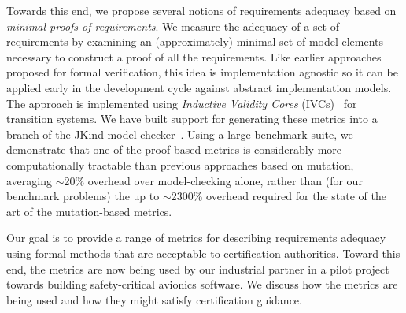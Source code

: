 \noindent Towards this end, we propose several notions of requirements adequacy based on {\em minimal proofs of requirements}.  We measure the adequacy of a set of requirements by examining an (approximately) minimal set of model elements necessary to construct a proof of all the requirements.  Like earlier approaches proposed for formal verification, this idea is implementation agnostic so it can be applied early in the development cycle against abstract implementation models.  The approach is implemented using {\em Inductive Validity Cores} (IVCs)~\cite{Ghass16} for transition systems.
We have built support for generating these metrics into a branch of the JKind model checker~\cite{jkind}.  Using a large benchmark suite, we demonstrate that one of the proof-based metrics is considerably more computationally tractable than previous approaches based on mutation, averaging ${\sim}$20\% overhead over model-checking alone, rather than (for our benchmark problems) the up to ${\sim}$2300\% overhead required for the state of the art of the mutation-based metrics.

\noindent Our goal is to provide a range of metrics for describing requirements adequacy using formal methods that are acceptable to certification authorities.  Toward this end, the metrics are now being used by our industrial partner  in a pilot project towards building safety-critical avionics software.  We discuss how the metrics are being used and how they might satisfy certification guidance.



